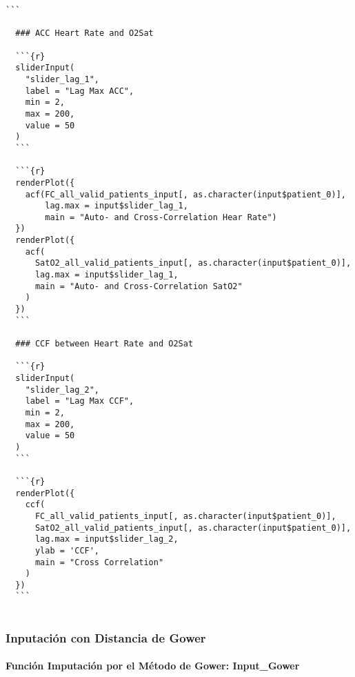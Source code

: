 \begin{lstlisting}[style=mystyle2,caption={Código Visualización de los Datos}, label={lst:codigo-visualizacion}]
  ```
  
  ### ACC Heart Rate and O2Sat
  
  ```{r}
  sliderInput(
    "slider_lag_1",
    label = "Lag Max ACC",
    min = 2,
    max = 200,
    value = 50
  )
  ```
  
  ```{r}
  renderPlot({
    acf(FC_all_valid_patients_input[, as.character(input$patient_0)],
        lag.max = input$slider_lag_1,
        main = "Auto- and Cross-Correlation Hear Rate")
  })
  renderPlot({
    acf(
      SatO2_all_valid_patients_input[, as.character(input$patient_0)],
      lag.max = input$slider_lag_1,
      main = "Auto- and Cross-Correlation SatO2"
    )
  })
  ```
  
  ### CCF between Heart Rate and O2Sat
  
  ```{r}
  sliderInput(
    "slider_lag_2",
    label = "Lag Max CCF",
    min = 2,
    max = 200,
    value = 50
  )
  ```
  
  ```{r}
  renderPlot({
    ccf(
      FC_all_valid_patients_input[, as.character(input$patient_0)],
      SatO2_all_valid_patients_input[, as.character(input$patient_0)],
      lag.max = input$slider_lag_2,
      ylab = 'CCF',
      main = "Cross Correlation"
    )
  })
  ```
  
\end{lstlisting}

\lstset{style=mystyle} 

\subsubsection{Inputación con Distancia de Gower}\label{sec:codigo-input-gower}

\paragraph{Función Imputación por el Método de Gower: Input\_Gower}\label{sec:codigo-input-gower-fun}


